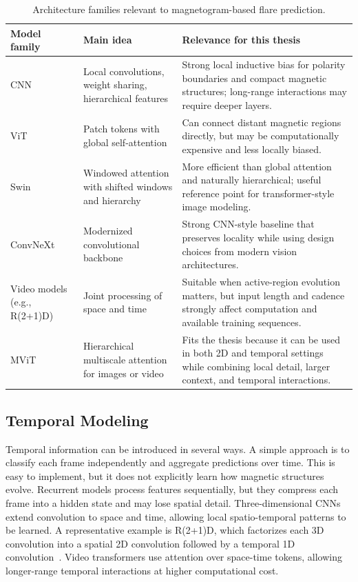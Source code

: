 \begin{table}[H]
\centering
\caption{Architecture families relevant to magnetogram-based flare prediction.}
\label{tab:intro_architecture_comparison}
\small
\renewcommand{\arraystretch}{1.18}
\setlength{\tabcolsep}{4pt}

\begin{tabularx}{\textwidth}{@{}>{\raggedright\arraybackslash}p{} >{\raggedright\arraybackslash}p{} >{\raggedright\arraybackslash}X@{}}
\toprule
Model family & Main idea & Relevance for this thesis \\
\midrule
CNN & Local convolutions, weight sharing, hierarchical features & Strong local inductive bias for polarity boundaries and compact magnetic structures; long-range interactions may require deeper layers. \\
ViT~\cite{ref_vit} & Patch tokens with global self-attention & Can connect distant magnetic regions directly, but may be computationally expensive and less locally biased. \\
Swin~\cite{ref_swin} & Windowed attention with shifted windows and hierarchy & More efficient than global attention and naturally hierarchical; useful reference point for transformer-style image modeling. \\
ConvNeXt~\cite{ref_convnext} & Modernized convolutional backbone & Strong CNN-style baseline that preserves locality while using design choices from modern vision architectures. \\
Video models (e.g., R(2+1)D) & Joint processing of space and time & Suitable when active-region evolution matters, but input length and cadence strongly affect computation and available training sequences. \\
MViT~\cite{ref_mvit} & Hierarchical multiscale attention for images or video & Fits the thesis because it can be used in both 2D and temporal settings while combining local detail, larger context, and temporal interactions. \\
\bottomrule
\end{tabularx}
\end{table}

\subsection{Temporal Modeling}

Temporal information can be introduced in several ways. A simple approach is to classify each frame independently and aggregate predictions over time. This is easy to implement, but it does not explicitly learn how magnetic structures evolve. Recurrent models process features sequentially, but they compress each frame into a hidden state and may lose spatial detail. Three-dimensional CNNs extend convolution to space and time, allowing local spatio-temporal patterns to be learned. A representative example is R(2+1)D, which factorizes each 3D convolution into a spatial 2D convolution followed by a temporal 1D convolution~\cite{ref_r2plus1d}. Video transformers use attention over space-time tokens, allowing longer-range temporal interactions at higher computational cost.

